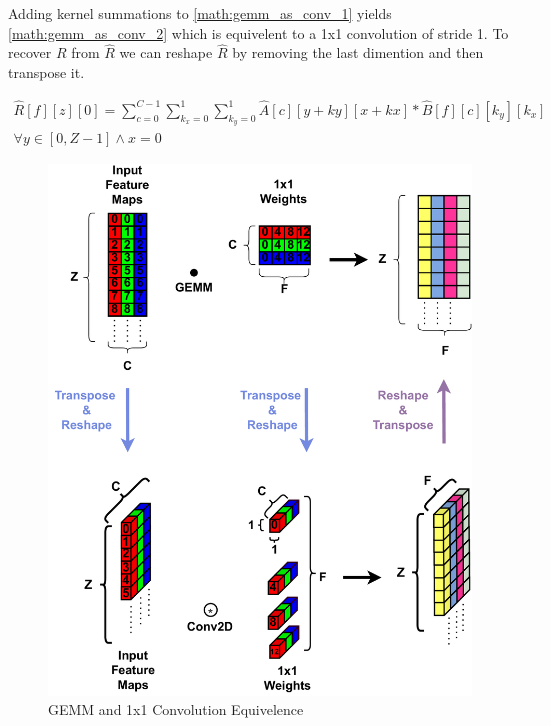 Adding kernel summations to \autoref{math:gemm_as_conv_1} yields
\autoref{math:gemm_as_conv_2} which is equivelent to a 1x1 convolution of stride
1. To recover $R$ from $\hat{R}$ we can reshape $\hat{R}$ by removing the
last dimention and then transpose it. 

\begin{equation}
    \begin{aligned}
        \hat{R}[f][z][0] = \displaystyle\sum\limits_{c=0}^{C-1}\displaystyle\sum\limits_{k_x=0}^{1} \displaystyle\sum\limits_{k_y=0}^{1}\hat{A}[c][y+ky][x+kx]*\hat{B}[f][c][k_y][k_x] \\ \forall y \in [0, Z-1] \land x = 0
    \end{aligned}
    \label{math:gemm_as_conv_2}
\end{equation}

\begin{figure}[]
    \centering
    \includegraphics[scale=0.5]{fig/GemmTo1x1Conv.pdf}
    \caption{\ac{GEMM} and 1x1 Convolution Equivelence}
    \label{fig:gemmTo1x1Conv}
\end{figure}



